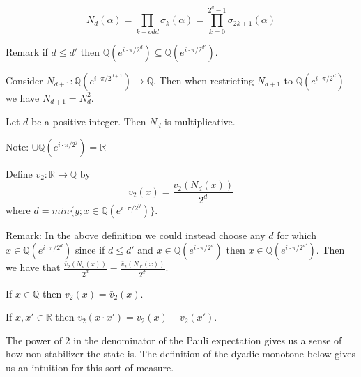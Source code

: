 \documentclass[12pt]{dalthesis}
\begin{document}
\begin{equation}
N_d(\alpha) = \prod_{k-odd} \sigma_k (\alpha) = \prod_{k=0}^{2^d - 1} \sigma_{2k+1} (\alpha)
\end{equation}

Remark if $d \leq d'$ then $\mathbb{Q}(e^{i\cdot \pi / 2^d}) \subseteq \mathbb{Q}(e^{i\cdot \pi / 2^{d'}})$.

\begin{proposition}
Consider $N_{d+1}: \mathbb{Q}(e^{i\cdot \pi / 2^{d+1}}) \longrightarrow \mathbb{Q}$. Then when restricting $N_{d+1}$ to $\mathbb{Q}(e^{i\cdot \pi / 2^{d}})$ we have $N_{d+1} = N_d^2$.
\end{proposition}

\begin{proposition}
Let $d$ be a positive integer. Then $N_d$ is multiplicative.
\end{proposition}

Note: $\cup \mathbb{Q}(e^{i\cdot \pi / 2^{j}}) = \mathbb{R}$
\begin{definition}
Define $v_2: \mathbb{R} \longrightarrow \mathbb{Q}$ by 
\begin{equation}
v_2 (x) = \frac{\bar{v}_2 (N_d (x))}{2^d}
\end{equation}
where $d = min\{ y; x \in \mathbb{Q} (e^{i \cdot \pi / 2^y })\}$.
\end{definition}

Remark: In the above definition we could instead choose any $d$ for which $x \in \mathbb{Q} (e^{i \cdot \pi / 2^d})$ since if $d \leq d'$ and $x \in \mathbb{Q} (e^{i \cdot \pi / 2^d})$ then $x \in \mathbb{Q} (e^{i \cdot \pi / 2^{d'}})$.
Then we have that $\frac{\bar{v}_2 (N_d (x))}{2^d} = \frac{\bar{v}_2 (N_{d'} (x))}{2^{d'}}$.

\begin{proposition}
If $x \in \mathbb{Q}$ then $v_2 (x) = \bar{v}_2 (x)$.
\end{proposition}

\begin{proposition}
If $x, x' \in \mathbb{R}$ then $v_2 (x \cdot x') = v_2 (x) + v_2 (x')$.
\end{proposition}




The power of $2$ in the denominator of the Pauli expectation gives us a sense of how non-stabilizer the state is. The definition of the dyadic monotone below gives us an intuition for this sort of measure. 
\end{document}
